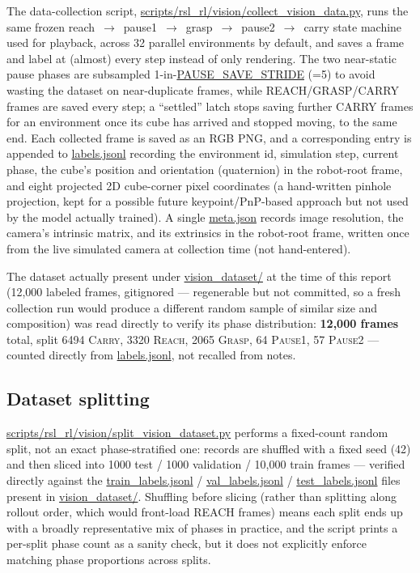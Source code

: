\documentclass[11pt]{article}
\begin{document}
The data-collection script,
\url{scripts/rsl_rl/vision/collect_vision_data.py}, runs the same frozen
reach~$\to$~pause1~$\to$~grasp~$\to$~pause2~$\to$~carry state machine used for
playback, across 32 parallel environments by default, and saves a frame and label
at (almost) every step instead of only rendering. The two near-static pause phases
are subsampled 1-in-\url{PAUSE_SAVE_STRIDE} (=5) to avoid wasting the dataset on near-duplicate frames, while
REACH/GRASP/CARRY frames are saved every step; a ``settled'' latch stops saving
further CARRY frames for an environment once its cube has arrived and stopped
moving, to the same end. Each collected frame is saved as an RGB PNG, and a
corresponding entry is appended to \url{labels.jsonl} recording the environment
id, simulation step, current phase, the cube's position and orientation
(quaternion) in the robot-root frame, and eight projected 2D cube-corner pixel
coordinates (a hand-written pinhole projection, kept for a possible future
keypoint/PnP-based approach but not used by the model actually trained). A single
\url{meta.json} records image resolution, the camera's intrinsic matrix, and its
extrinsics in the robot-root frame, written once from the live simulated camera at
collection time (not hand-entered).

The dataset actually present under \url{vision_dataset/} at the time of this
report (12{,}000 labeled frames, gitignored --- regenerable but not committed, so a
fresh collection run would produce a different random sample of similar size and
composition) was read directly to verify its phase distribution: \textbf{12{,}000 frames}
total, split 6494 \textsc{Carry}, 3320 \textsc{Reach},
2065 \textsc{Grasp}, 64 \textsc{Pause1}, 57 \textsc{Pause2} --- counted directly
from \url{labels.jsonl}, not recalled from notes.

\subsection{Dataset splitting}

\url{scripts/rsl_rl/vision/split_vision_dataset.py} performs a fixed-count random
split, not an exact phase-stratified one: records are shuffled with a fixed seed
(42) and then sliced into 1000 test / 1000 validation / 10{,}000 train frames ---
verified directly against the \url{train_labels.jsonl} / \url{val_labels.jsonl}
/ \url{test_labels.jsonl} files present in \url{vision_dataset/}. Shuffling before slicing (rather than splitting along rollout order, which would
front-load REACH frames) means each split ends up with a broadly representative mix
of phases in practice, and the script prints a per-split phase count as a sanity
check, but it does not explicitly enforce matching phase proportions across
splits.
\end{document}
